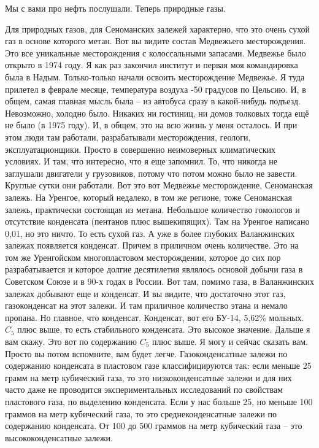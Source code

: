 \documentclass[main.tex]{subfiles}
\begin{document}
Мы с вами про нефть послушали.
Теперь природные газы.

Для природных газов, для Сеноманских залежей характерно, что это очень сухой газ в основе которого метан.
Вот вы видите состав Медвежьего месторождения.
Это все уникальные месторождения с колоссальными запасами.
Медвежье было открыто в 1974 году.
Я как раз закончил институт и первая моя командировка была в Надым.
Только-только начали освоить месторождение Медвежье.
Я туда прилетел в феврале месяце, температура воздуха -50 градусов по Цельсию.
И, в общем, самая главная мысль была -- из автобуса сразу в какой-нибудь подъезд.
Невозможно, холодно было.
Никаких ни гостиниц, ни домов толковых тогда ещё не было (в 1975 году).
И, в общем, это на всю жизнь у меня осталось.
И при этом люди там работали, разрабатывали месторождения, геологи, эксплуатационщики.
Просто в совершенно неимоверных климатических условиях.
И там, что интересно, что я еще запомнил.
То, что никогда не заглушали двигатели у грузовиков, потому что потом можно было не завести.
Круглые сутки они работали.
Вот это вот Медвежье месторождение, Сеноманская залежь.
На Уренгое, который недалеко, в том же регионе, тоже Сеноманская залежь, практически состоящая из метана.
Небольшое количество гомологов и отсутствие конденсата (пентанов плюс вышекипящих).
Там на Уренгое написано 0,01, но это ничто.
То есть сухой газ.
А уже в более глубоких Валанжинских залежах появляется конденсат.
Причем в приличном очень количестве.
Это на том же Уренгойском многопластовом месторождении, которое до сих пор разрабатывается и которое долгие десятилетия являлось основой добычи газа в Советском Союзе и в 90-х годах в России.
Вот там, помимо газа, в Валанжинских залежах добывают еще и конденсат.
И вы видите, что достаточно этот газ, газоконденсат на этот залежи.
И там приличное количество этана и немало пропана.
Но главное, что конденсат.
Конденсат, вот его БУ-14, 5,62\% мольных.
$C_5$ плюс выше, то есть стабильного конденсата.
Это высокое значение.
Дальше я вам скажу.
Это вот по содержанию $C_5$ плюс выше.
Я могу и сейчас сказать вам.
Просто вы потом вспомните, вам будет легче.
Газоконденсатные залежи по содержанию конденсата в пластовом газе классифицируются так: если меньше 25 грамм на метр кубический газа, то это низкоконденсатные залежи и для них часто даже не проводится экспериментальных исследований по свойствам пластового газа, по выделению конденсата.
Если у нас больше 25, но меньше 100 граммов на метр кубический газа, то это среднеконденсатные залежи по содержанию конденсата.
От 100 до 500 граммов на метр кубический газа -- это высококонденсатные залежи.
\end{document}
